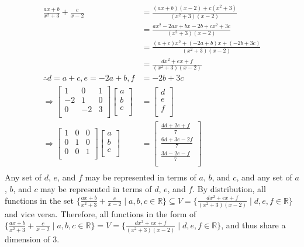 \documentclass[10pt]{article}
\begin{document}
{{		\begin{align}
			\frac{ax+b}{x^2+3}+\frac{c}{x-2} &= \frac{(ax+b)(x-2)+c(x^2+3)}{(x^2+3)(x-2)} \\
			&= \frac{ax^2-2ax+bx-2b+cx^2+3c}{(x^2+3)(x-2)} \\
			&= \frac{(a+c)x^2+(-2a+b)x+(-2b+3c)}{(x^2+3)(x-2)} \\
			&= \frac{dx^2+ex+f}{(x^2+3)(x-2)} \\
			\therefore d = a+c, e = -2a+b, f &= -2b+3c \\
			\Rightarrow 
			\begin{bmatrix}
				1 & 0 & 1 \\
				-2 & 1 & 0 \\
				0 & -2 & 3 \\
			\end{bmatrix}
			\begin{bmatrix}
				a \\
				b \\
				c \\
			\end{bmatrix}
			&=
			\begin{bmatrix}
				d \\
				e \\
				f \\
			\end{bmatrix} \\
			\Rightarrow
			\begin{bmatrix}
				1 & 0 & 0 \\
				0 & 1 & 0 \\
				0 & 0 & 1 \\
			\end{bmatrix}
			\begin{bmatrix}
				a \\
				b \\
				c \\
			\end{bmatrix}
			&=
			\begin{bmatrix}
				\frac{4d + 2e + f}{7} \\
				\frac{6d + 3e - 2f}{7} \\
				\frac{3d - 2e - f}{7} \\
			\end{bmatrix} \\
		\end{align}
  		Any set of $d$, $e$, and $f$ may be represented in terms of $a$, $b$, and 
		$c$, and any set of $a$, $b$, and $c$ may be represented in terms of $d$, $e$, and 
		$f$. By distribution, all functions in the set 
		$\{\frac{ax + b}{x^{2}+3}+\frac{c}{x-2} \mid a, b, c \in \mathbb{R} \} 
		\subseteq V = \{\frac{dx^2+ex+f}{(x^2+3)(x-2)} \mid d, e, f \in \mathbb{R}\}$ 
		and vice versa. Therefore, all functions in the form of 
		$\{\frac{ax + b}{x^{2}+3}+\frac{c}{x-2} \mid a, b, c \in \mathbb{R} \} 
		= V = \{\frac{dx^2+ex+f}{(x^2+3)(x-2)} \mid d, e, f \in \mathbb{R}\}$, 
		and thus share a dimension of 3.
	}
}
\end{document}
